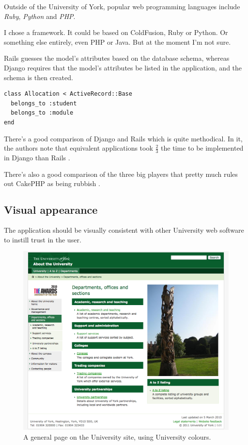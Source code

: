 \documentclass[]{scrartcl}
\begin{document}

Outside of the University of York, popular web programming languages include
\emph{Ruby}, \emph{Python} and \emph{PHP}.

I chose a framework. It could be based on ColdFusion, Ruby or Python. Or
something else entirely, even PHP or Java. But at the moment I'm not sure.

Rails guesses the model's attributes based on the database schema, whereas
Django requires that the model's attributes be listed in the application, and
the schema is then created.

\begin{lstlisting}
class Allocation < ActiveRecord::Base
  belongs_to :student
  belongs_to :module
end
\end{lstlisting}

There's a good comparison of Django and Rails which is quite methodical. In
it, the authors note that equivalent applications took $\frac{2}{3}$ the time
to be implemented in Django than Rails \cite{RailsDjangoComparison_2007}.

There's also a good comparison of the three big players that pretty much rules
out CakePHP as being rubbish \cite{EvalWebDevFrameworks_2009}.

\subsection{Visual appearance}

The application should be visually consistent with other University web
software to instill trust in the user.

\begin{figure}
  \begin{center}
    \includegraphics[width=160mm]{images/2011_11_06_yorkacuk.png}
  \end{center}
  \caption{A general page on the University site, using University colours.}
  \label{yorkacuk_general_page}
\end{figure}
\end{document}
